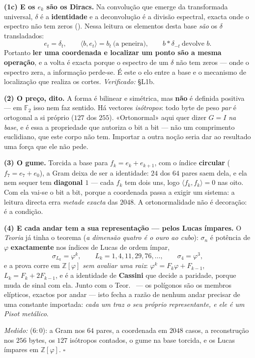 \documentclass[livro.tex]{subfiles}
\begin{document}
\begin{teorema}
\textbf{(1c) E os $e_k$ são os Diracs.} Na convolução que emerge da transformada
universal, $\delta$ é a \textbf{identidade} e a deconvolução é a divisão
espectral, exacta onde o espectro não tem zeros
(). Nessa leitura os elementos desta base
\emph{são} os $\delta$ transladados:
\[
\boxed{\;e_t=\delta_t,\qquad
\langle b,e_t\rangle=b_t\ \text{(a peneira)},\qquad
b\ast\delta_{-t}\ \text{devolve } b .\;}
\]
Portanto \textbf{ler uma coordenada e localizar um ponto são a mesma operação}, e
a volta é exacta porque o espectro de um $\delta$ não tem zeros --- onde o
espectro zera, a informação perde-se. É este o elo entre a base e o mecanismo de
localização que realiza os cortes. \emph{Verificado:}
 \S L1b.

\textbf{(2) O preço, dito.} A forma é bilinear e simétrica, mas
\textbf{não} é definida positiva --- em $\mathbb{F}_2$ isso nem faz
sentido. Há vectores \emph{isótropos}: todo byte de peso \emph{par} é
ortogonal a si próprio ($127$ dos $255$). «Ortonormal» aqui quer dizer
$G=I$ \emph{na base}, e é essa a propriedade que autoriza o bit a bit ---
não um comprimento euclidiano, que este corpo não tem. Importar a outra
noção seria dar ao resultado uma força que ele não pede.

\textbf{(3) O gume.} Torcida a base para $f_k=e_k+e_{k+1}$, com o índice
\textbf{circular} ($f_7=e_7+e_0$), a Gram deixa de ser a identidade: $24$ dos $64$
pares saem dela, e ela nem sequer tem \textbf{diagonal $1$} --- cada $f_k$ tem dois
uns, logo $\langle f_k,f_k\rangle=0$ nas oito. Com ela vai-se o bit a bit, porque a
coordenada passa a exigir um sistema: a leitura directa erra \emph{metade exacta}
das $2048$. A ortonormalidade não é decoração: é a condição.

\textbf{(4) E cada andar tem a sua representação --- pelos Lucas
ímpares.} O \emph{Teoria} já tinha o teorema
(\emph{a dimensão quatro é o ouro ao cubo}): $\sigma_n$ é potência de
$\varphi$ \textbf{exactamente} nos índices de Lucas de ordem ímpar,
\[
\sigma_{L_k}=\varphi^{k},\qquad L_k=1,4,11,29,76,\ldots,
\qquad \sigma_4=\varphi^{3},
\]
e a prova corre em $\mathbb{Z}[\varphi]$ \emph{sem avaliar uma raiz}:
$\varphi^{k}=F_k\varphi+F_{k-1}$, $L_k=F_k+2F_{k-1}$, e é a identidade de
\textbf{Cassini} que decide a paridade, porque muda de sinal com ela.
Junto com o Teor.~ --- os polígonos são os membros
elípticos, exactos por andar --- isto fecha a razão de nenhum andar
precisar de uma constante importada: \emph{cada um traz o seu próprio
representante, e ele é um Pisot metálico}.

\emph{Medido:}  ($6{:}0$): a Gram nos $64$ pares,
a coordenada em $2048$ casos, a reconstrução nos $256$ bytes, os $127$
isótropos contados, o gume na base torcida, e os Lucas ímpares em
$\mathbb{Z}[\varphi]$. $\square$
\end{teorema}
\end{document}
